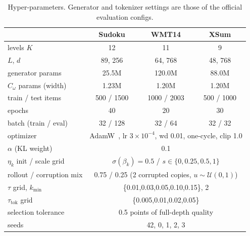 \begin{table}[t]
\centering
\caption{Hyper-parameters. Generator and tokenizer settings are those of the official evaluation configs.}
\label{tab:hp}
\footnotesize\setlength{\tabcolsep}{2.5pt}
\begin{tabular}{lccc}
\toprule
 & Sudoku & WMT14 & XSum\\
\midrule
levels $K$ & 12 & 11 & 9\\
$L$, $d$ & 89, 256 & 64, 768 & 48, 768\\
generator params & 25.5M & 120.0M & 88.0M\\
$C_\omega$ params (width) & 1.23M & 1.20M & 1.20M\\
train / test items & 500 / 1500 & 1000 / 2003 & 500 / 1000\\
epochs & 40 & 20 & 30\\
batch (train / eval) & 32 / 128 & 32 / 64 & 32 / 32\\
optimizer & \multicolumn{3}{c}{AdamW~\citep{loshchilov2019adamw}, lr $3{\times}10^{-4}$, wd 0.01, one-cycle, clip 1.0}\\
$\alpha$ (KL weight) & \multicolumn{3}{c}{0.1}\\
$\eta_k$ init / scale grid & \multicolumn{3}{c}{$\sigma(\beta_k)=0.5$ / $s\in\{0,0.25,0.5,1\}$}\\
rollout / corruption mix & \multicolumn{3}{c}{0.75 / 0.25 (2 corrupted copies, $u\sim\mathcal{U}(0,1)$)}\\
$\tau$ grid, $k_{\min}$ & \multicolumn{3}{c}{\{0.01,0.03,0.05,0.10,0.15\}, 2}\\
$\tau_{\mathrm{tok}}$ grid & \multicolumn{3}{c}{\{0.005,0.01,0.02,0.05\}}\\
selection tolerance & \multicolumn{3}{c}{0.5 points of full-depth quality}\\
seeds & \multicolumn{3}{c}{42, 0, 1, 2, 3}\\
\bottomrule
\end{tabular}
\end{table}
